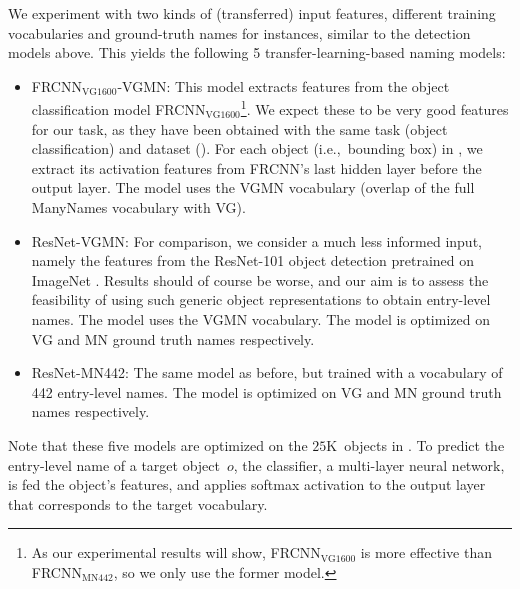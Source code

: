 We experiment with two kinds of (transferred) input features, different training vocabularies and ground-truth names for instances, similar to the detection models above.
This yields the following 5 transfer-learning-based naming models:
\begin{itemize}
\item FRCNN$_{\text{VG1600}}$-VGMN:
	This model extracts features from the object classification model FRCNN$_{\text{VG1600}}$\footnote{
	As our experimental results will show, FRCNN$_{\text{VG1600}}$ is more effective than FRCNN$_{\text{MN442}}$, so we only use the former model.
}. We expect these to be very good features for our task, as they have been obtained with the same task (object classification) and dataset (\vg).  For each object (i.e.,~bounding box) in \mn, we extract its activation features from FRCNN's last hidden layer before the output layer. The model uses the VGMN vocabulary (overlap of the full ManyNames vocabulary with VG).
  \item ResNet-VGMN: 
For comparison, we consider a much less informed input, namely the features from the ResNet-101 object detection  pretrained on ImageNet \cite{imagenet_cvpr09}.
Results should of course be worse, and our aim is to assess the feasibility of using such generic object representations to obtain entry-level names. The model uses the VGMN vocabulary.  The model is optimized on VG and MN ground truth names respectively.
 \item  ResNet-MN442:
 The same model as before, but trained with a vocabulary of 442 entry-level names. The model is optimized on VG and MN ground truth names respectively.
\end{itemize}
Note that these five models are optimized on the $25$K~objects in \mn. 
To predict the entry-level name of a target object~$o$, the classifier, a multi-layer neural network, is fed the object's features, and applies softmax activation to the output layer that corresponds to the target vocabulary. 

